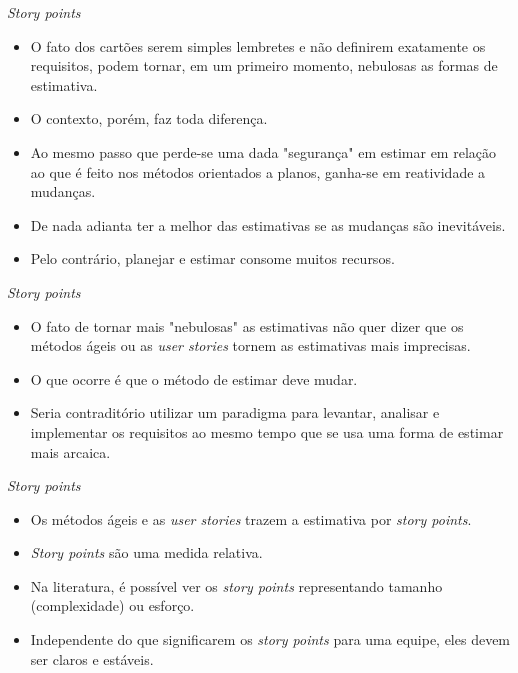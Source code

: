 \documentclass[11pt]{beamer}
\begin{document}
    \begin{frame}{\textit{Story points}}
        \begin{itemize}
            \item O fato dos cartões serem simples lembretes e não definirem exatamente os requisitos, podem tornar, em um primeiro momento, nebulosas as formas de estimativa.
            \item O contexto, porém, faz toda diferença.
            \item Ao mesmo passo que perde-se uma dada "segurança" em estimar em relação ao que é feito nos métodos orientados a planos, ganha-se em reatividade a mudanças.
            \item De nada adianta ter a melhor das estimativas se as mudanças são inevitáveis.
            \item Pelo contrário, planejar e estimar consome muitos recursos.
        \end{itemize}
    \end{frame}

    \begin{frame}{\textit{Story points}}
        \begin{itemize}
            \item O fato de tornar mais "nebulosas" as estimativas não quer dizer que os métodos ágeis ou as \textit{user stories} tornem as estimativas mais imprecisas.
            \item O que ocorre é que o método de estimar deve mudar.
            \item Seria contraditório utilizar um paradigma para levantar, analisar e implementar os requisitos ao mesmo tempo que se usa uma forma de estimar mais arcaica. 
        \end{itemize}
    \end{frame}

    \begin{frame}{\textit{Story points}}
        \begin{itemize}
            \item Os métodos ágeis e as \textit{user stories} trazem a estimativa por \textit{story points}.
            \item \textit{Story points} são uma medida relativa.
            \item Na literatura, é possível ver os \textit{story points} representando tamanho (complexidade) ou esforço.
            \item Independente do que significarem os \textit{story points} para uma equipe, eles devem ser claros e estáveis.
        \end{itemize}
    \end{frame}
\end{document}
